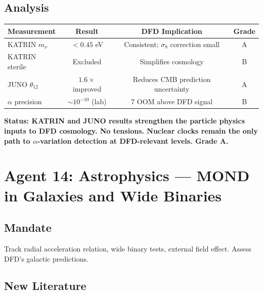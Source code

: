 \documentclass[11pt,a4paper]{article}
\begin{document}
\subsection{Analysis}

\begin{center}
\begin{tabular}{lccc}
\toprule
\textbf{Measurement} & \textbf{Result} & \textbf{DFD Implication} & \textbf{Grade} \\
\midrule
KATRIN $m_\nu$ & $< 0.45$ eV & Consistent; $\sigma_8$ correction small & A \\
KATRIN sterile & Excluded & Simplifies cosmology & B \\
JUNO $\theta_{12}$ & $1.6\times$ improved & Reduces CMB prediction uncertainty & A \\
$\alpha$ precision & $\sim 10^{-10}$ (lab) & 7 OOM above DFD signal & B \\
\bottomrule
\end{tabular}
\end{center}

\textbf{Status: KATRIN and JUNO results strengthen the particle physics inputs to DFD cosmology. No tensions. Nuclear clocks remain the only path to $\alpha$-variation detection at DFD-relevant levels. Grade A.}

\section{Agent 14: Astrophysics --- MOND in Galaxies and Wide Binaries}

\subsection{Mandate}
Track radial acceleration relation, wide binary tests, external field effect. Assess DFD's galactic predictions.

\subsection{New Literature}
\end{document}
